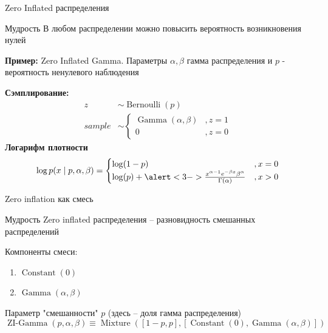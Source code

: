 \documentclass{beamer}
\begin{document}
\begin{frame}{Zero Inflated распределения}
    \begin{block}{Мудрость}
        В любом распределении можно повысить вероятность возникновения нулей
    \end{block}
    \textbf{Пример:} Zero Inflated Gamma. Параметры $\alpha, \beta$ гамма распределения и $p$ - вероятность ненулевого наблюдения
    
    \textbf{Сэмплирование:}
    \begin{align*}
        z &\sim \operatorname{Bernoulli}(p)\\
        sample &\sim \begin{cases}
        \operatorname{Gamma}(\alpha, \beta)&, z = 1\\
        0&, z =0
        \end{cases}
    \end{align*}
    \pause
    \textbf{Логарифм плотности}
    \begin{equation*}
        \log p(x\cond p, \alpha, \beta) = \begin{cases}
        \log(1-p) &,x=0\\
        \log(p) + \alert<3->{\frac {x^{\alpha -1}e^{-\beta x}\beta ^{\alpha }}{\Gamma (\alpha )}}
        &,x> 0
        \end{cases}
    \end{equation*}
\end{frame}
\begin{frame}{Zero inflation как смесь}
    \begin{block}{Мудрость}
        Zero inflated распределения -- разновидность смешанных распределений
    \end{block}
    Компоненты смеси:
    \begin{enumerate}
        \item $\operatorname{Constant}(0)$
        \item $\operatorname{Gamma}(\alpha, \beta)$
    \end{enumerate}
    Параметр "смешанности" $p$ (здесь -- доля гамма распределения)
    \begin{equation*}
        \operatorname{ZI-Gamma}(p, \alpha, \beta) \equiv \operatorname{Mixture}([1-p, p], [\operatorname{Constant}(0), \operatorname{Gamma}(\alpha, \beta)])
    \end{equation*}
\end{frame}
\end{document}
